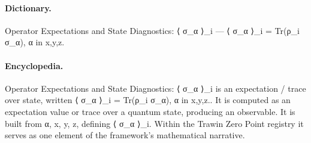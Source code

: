 \paragraph{Dictionary.}
Operator Expectations and State Diagnostics: ⟨ σ\_α ⟩\_i — ⟨ σ\_α ⟩\_i = Tr(ρ\_i σ\_α), α in x,y,z.

\paragraph{Encyclopedia.}
Operator Expectations and State Diagnostics: ⟨ σ\_α ⟩\_i is an expectation / trace over state, written ⟨ σ\_α ⟩\_i = Tr(ρ\_i σ\_α), α in x,y,z.. It is computed as an expectation value or trace over a quantum state, producing an observable. It is built from α, x, y, z, defining ⟨ σ\_α ⟩\_i. Within the Trawin Zero Point registry it serves as one element of the framework's mathematical narrative.

